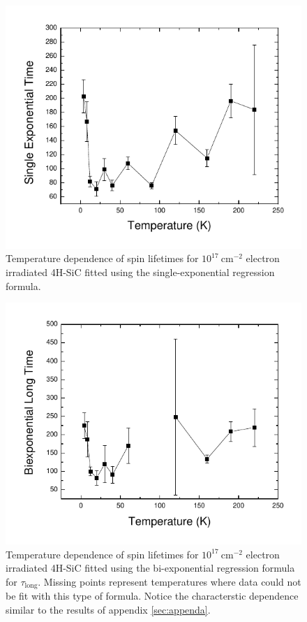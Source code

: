 \documentclass[oneside]{BYUPhys}
\begin{document}
\begin{appendices}
\begin{figure}
    \centerline{\includegraphics{e17-lifetimes-single}}
    \caption[Electron Irradiated SiC Temperature Dependence for Single-Exponential Spin Coherence]{\label{fig:SiCElectronSingle}
     Temperature dependence of spin lifetimes for $10^{17}~\text{cm}^{-2}$ electron irradiated 4H-SiC fitted using the single-exponential regression formula.}
 \end{figure}

\begin{figure}
    \centerline{\includegraphics{e17-lifetimes-bi}}
    \caption[Electron Irradiated SiC Temperature Dependence for Single-Exponential Spin Coherence]{\label{fig:SiCElectronSingle}
     Temperature dependence of spin lifetimes for $10^{17}~\text{cm}^{-2}$ electron irradiated 4H-SiC fitted using the bi-exponential regression formula for $\tau_\text{long}$. Missing points represent temperatures where data could not be fit with this type of formula. Notice the characterstic dependence similar to the results of appendix \ref{sec:appenda}.}
 \end{figure}


\end{appendices}
\end{document}
